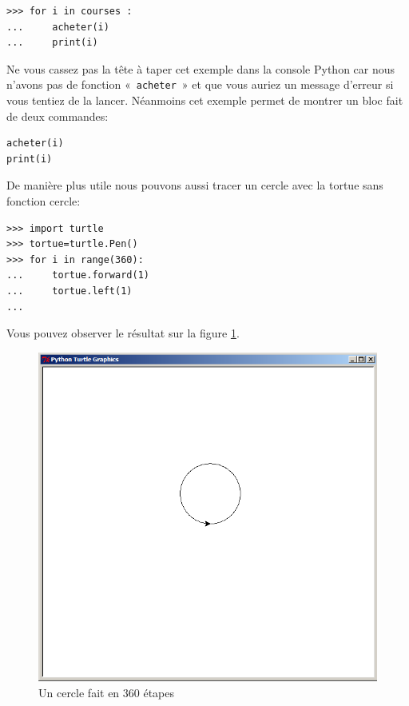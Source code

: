 \begin{Verbatim}[frame=single,rulecolor=\color{gray}, label=ne pas saisir]
>>> for i in courses :
... 	acheter(i)
... 	print(i)
\end{Verbatim}

Ne vous cassez pas la tête à taper cet exemple dans la console Python car nous n'avons pas de fonction «~\texttt{acheter}~» et que vous auriez un message d'erreur si vous tentiez de la lancer. 
Néanmoins cet exemple permet de montrer un bloc fait de deux commandes:

\begin{Verbatim}[frame=single,rulecolor=\color{gray}, label=ne pas saisir]
acheter(i)
print(i)
\end{Verbatim}

De manière plus utile nous pouvons aussi tracer un cercle avec la tortue sans fonction cercle:

\begin{Verbatim}[frame=single,rulecolor=\color{green}, label=à taper avec attention]
>>> import turtle
>>> tortue=turtle.Pen()
>>> for i in range(360):
...     tortue.forward(1)
...     tortue.left(1)
...
\end{Verbatim}

Vous pouvez observer le résultat sur la figure \ref{fig:cercle}.
\begin{figure}[H]
\centering
\includegraphics[scale=0.4]{images/cercle.png}
\caption{Un cercle fait en 360 étapes}
\label{fig:cercle}
\end{figure}


